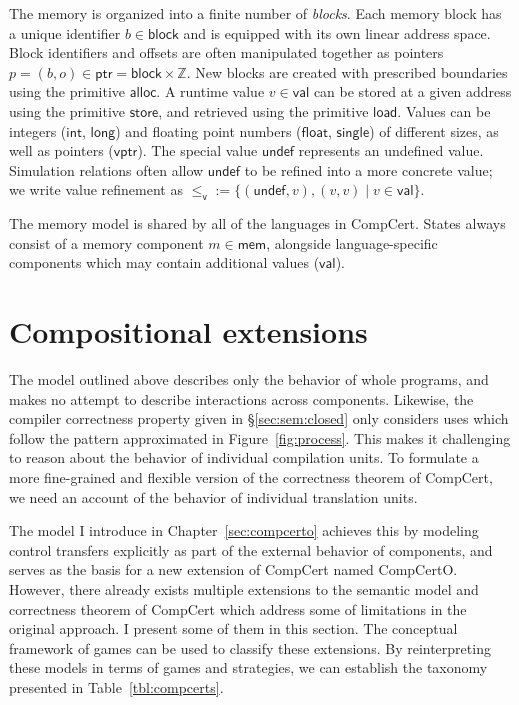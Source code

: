 \documentclass[11pt,oneside]{book}
\theoremstyle{definition}
\newcommand{\kw}[1]{\ensuremath{ \mathsf{#1} }}
\newcommand{\vref}{\le_\kw{v}}   %
\begin{document}
The memory is organized into a finite number of \emph{blocks}.
Each memory block has a unique identifier $b \in \kw{block}$
and is equipped with its own linear address space.
Block identifiers and offsets are often manipulated together
as pointers $p = (b, o) \in \kw{ptr} = \kw{block} \times \mathbb{Z}$.
New blocks are created with prescribed boundaries
using the primitive $\kw{alloc}$.
A runtime value $v \in \kw{val}$ can be stored at
a given address using the primitive \kw{store},
and retrieved using the primitive \kw{load}.
Values can be integers (\kw{int}, \kw{long}) and
floating point numbers (\kw{float}, \kw{single})
of different sizes,
as well as pointers (\kw{vptr}).
The special value \kw{undef}
represents an undefined value.
Simulation relations
often allow $\kw{undef}$
to be refined into a more concrete value;
we write value refinement as
${\vref} := \{(\kw{undef}, v), (v, v) \mid v \in \kw{val}\}$.

The memory model is shared by all of the languages in CompCert.
States always consist of
a memory component $m \in \kw{mem}$,
alongside language-specific components
which may contain additional values ($\kw{val}$).




\section{Compositional extensions} \label{sec:compcert-ext} %

The model outlined above
describes only the behavior of whole programs,
and makes no attempt to describe interactions across components.
Likewise,
the compiler correctness property
given in \S\ref{sec:sem:closed}
only considers uses which follow
the pattern approximated in Figure~\ref{fig:process}.
This makes it challenging to reason about
the behavior of individual compilation units.
To formulate a more fine-grained and flexible
version of the correctness theorem of CompCert,
we need an account of
the behavior of individual translation units.

The model I introduce in Chapter~\ref{sec:compcerto}
achieves this by modeling control transfers explicitly
as part of the external behavior of components,
and serves as the basis for a new extension of CompCert
named CompCertO.
However,
there already exists multiple extensions
to the semantic model
and correctness theorem of CompCert
which address some of limitations
in the original approach.
I present some of them in this section.
The conceptual framework of games
can be used to classify these extensions.
By reinterpreting these models
in terms of games and strategies,
we can establish the taxonomy presented in
Table~\ref{tbl:compcerts}.
\end{document}
